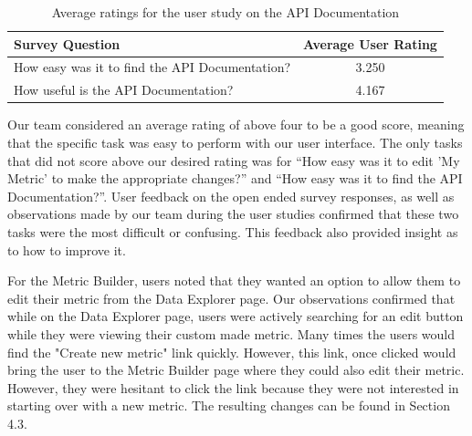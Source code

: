 			\begin{table}[t]
				\centering
				\begin{tabularx}{\textwidth}{@{} Y c @{}} %
					\toprule
					Survey Question																& Average User Rating	\\
					\midrule
					
					How easy was it to find the API Documentation?								& 3.250					\\
					How useful is the API Documentation?										& 4.167					\\
					
					\bottomrule
				\end{tabularx}
				\caption{Average ratings for the user study on the API Documentation}
				\label{apitest}
			\end{table}	
		
		Our team considered an average rating of above four to be a good score, 
		meaning that the specific task was easy to perform with our user interface.
		The only tasks that did not score above our desired rating was for 
		“How easy was it to edit 'My Metric' to make the appropriate changes?” 
		and “How easy was it to find the API Documentation?”. User feedback on the 
		open ended survey responses, as well as observations made by our team during 
		the user studies confirmed that these two tasks were the most 
		difficult or confusing. This feedback also provided insight as to how to improve it.
		
		For the Metric Builder, users noted that they wanted an option to 
		allow them to edit their metric from the Data Explorer page. 
		Our observations confirmed that while on the Data Explorer page, 
		users were actively searching for an edit button while they were 
		viewing their custom made metric. Many times the users would find the 
		"Create new metric" link quickly. However, this link, once clicked would bring the 
		user to the Metric Builder page where they could also edit their metric. 
		However, they were hesitant to click the link because they were not 
		interested in starting over with a new metric. The resulting changes can be found in Section 4.3.
		
